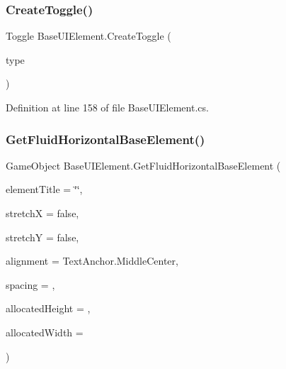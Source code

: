 \mbox{\label{class_base_u_i_element_a6a88fe381d2b20203669af0057669a9b}} 
\subsubsection{\texorpdfstring{Create\+Toggle()}{CreateToggle()}}
{\footnotesize\ttfamily Toggle Base\+U\+I\+Element.\+Create\+Toggle (\begin{DoxyParamCaption}\item[{string}]{type }\end{DoxyParamCaption})\hspace{0.3cm}{\ttfamily [protected]}}



Definition at line 158 of file Base\+U\+I\+Element.\+cs.

\mbox{\label{class_base_u_i_element_a4d35178a8b799757bcec7bb3c22ec92d}} 
\subsubsection{\texorpdfstring{Get\+Fluid\+Horizontal\+Base\+Element()}{GetFluidHorizontalBaseElement()}}
{\footnotesize\ttfamily Game\+Object Base\+U\+I\+Element.\+Get\+Fluid\+Horizontal\+Base\+Element (\begin{DoxyParamCaption}\item[{string}]{element\+Title = {\ttfamily \char`\"{}\char`\"{}},  }\item[{bool}]{stretchX = {\ttfamily false},  }\item[{bool}]{stretchY = {\ttfamily false},  }\item[{Text\+Anchor}]{alignment = {\ttfamily TextAnchor.MiddleCenter},  }\item[{int}]{spacing = {},  }\item[{int}]{allocated\+Height = {},  }\item[{int}]{allocated\+Width = {} }\end{DoxyParamCaption})\hspace{0.3cm}{\ttfamily [protected]}}



